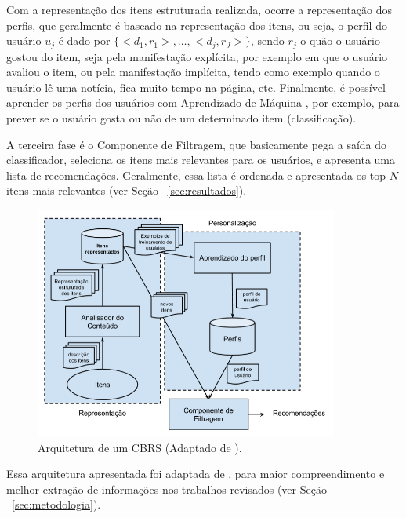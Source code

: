 \documentclass[normaltoc, espacoumemeio, pnumromarab,ruledheader]{abnt}
\begin{document}
Com a representação dos itens estruturada realizada, ocorre a representação dos perfis, que geralmente é baseado na representação dos itens, ou seja, o perfil do usuário $u_j$ é dado por $\{<d_1, r_1>, \dots, <d_j, r_J>\}$, sendo $r_j$ o quão o usuário gostou do item, seja pela manifestação explícita, por exemplo em que o usuário avaliou o item, ou pela manifestação implícita, tendo como exemplo quando o usuário lê uma notícia, fica muito tempo na página, etc. Finalmente, é possível aprender os perfis dos usuários com Aprendizado de Máquina \cite{Adomavicius2005,Lops2011,Jannach2011}, por exemplo, para prever se o usuário gosta ou não de um determinado item (classificação).

A terceira fase é o Componente de Filtragem, que basicamente pega a saída do classificador, seleciona os itens mais relevantes para os usuários, e apresenta uma lista de recomendações. Geralmente, essa lista é ordenada e apresentada os top $N$ itens mais relevantes (ver Seção ~\ref{sec:resultados}).

\begin{figure}[h]
\centering
\includegraphics[width=100mm]{img/approach.png}
\caption{Arquitetura de um CBRS (Adaptado de \cite{Lops2011}).}
\label{fig:approach}
\end{figure}

Essa arquitetura apresentada foi adaptada de \cite{Lops2011}, para maior compreendimento e melhor extração de informações nos trabalhos revisados (ver Seção ~\ref{sec:metodologia}).

\end{document}
